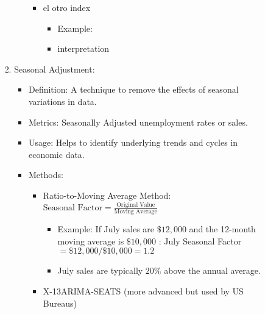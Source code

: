 \documentclass[10pt]{article}
\begin{document}
\begin{enumerate}
\begin{enumerate}
\begin{enumerate}
\begin{enumerate}
\begin{itemize}
\begin{itemize}
          \item el otro index

          \begin{itemize}
            \item Example: 
            \item interpretation
          \end{itemize}

        \end{itemize}
    \end{itemize}

  \item Seasonal Adjustment:
    \begin{itemize}
      \item Definition: A technique to remove the effects of seasonal variations in data.
      \item Metrics: Seasonally Adjusted unemployment rates or sales.
      \item Usage: Helps to identify underlying trends and cycles in economic data.
      \item Methods:
        \begin{itemize}
          \item Ratio-to-Moving Average Method: $ \text{Seasonal Factor} = \frac{\text{Original Value}}{\text{Moving Average}} $
            \begin{itemize}
              \item Example:  If July sales are $\$ 12,000$ and the 12-month moving average is $\$ 10,000$ : July Seasonal Factor $=\$ 12,000 / \$ 10,000=1.2$
              \item July sales are typically $20 \%$ above the annual average.
            \end{itemize}

          \item X-13ARIMA-SEATS (more advanced but used by US Bureaus)
        \end{itemize}
    \end{itemize}


\end{enumerate}
\end{enumerate}
\end{enumerate}
\end{enumerate}
\end{document}
